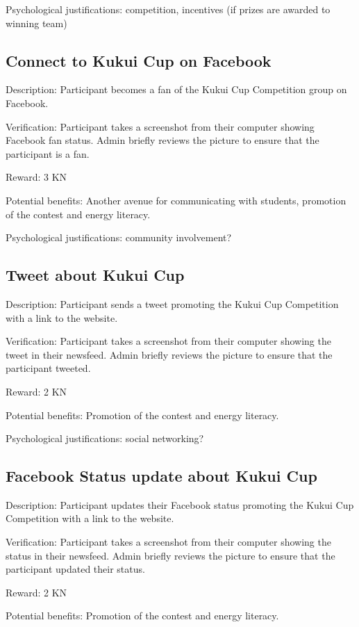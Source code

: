 Psychological justifications: competition, incentives (if prizes are awarded to winning team)

\subsection{Connect to Kukui Cup on Facebook}

Description: Participant becomes a fan of the Kukui Cup Competition group on Facebook.

Verification: Participant takes a screenshot from their computer showing Facebook fan status. Admin briefly reviews the picture to ensure that the participant is a fan.

Reward: 3 KN

Potential benefits: Another avenue for communicating with students, promotion of the contest and energy literacy.

Psychological justifications: community involvement?

\subsection{Tweet about Kukui Cup}

Description: Participant sends a tweet promoting the Kukui Cup Competition with a link to the website.

Verification: Participant takes a screenshot from their computer showing the tweet in their newsfeed. Admin briefly reviews the picture to ensure that the participant tweeted.

Reward: 2 KN

Potential benefits: Promotion of the contest and energy literacy.

Psychological justifications: social networking?

\subsection{Facebook Status update about Kukui Cup}

Description: Participant updates their Facebook status promoting the Kukui Cup Competition with a link to the website.

Verification: Participant takes a screenshot from their computer showing the status in their newsfeed. Admin briefly reviews the picture to ensure that the participant updated their status.

Reward: 2 KN

Potential benefits: Promotion of the contest and energy literacy.

